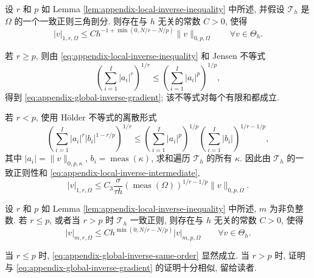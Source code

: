 \setcounter{statement}{2}
\begin{Corollary}\label{cor:appendix-global-inverse-gradient}
设 $r$ 和 $p$ 如 Lemma \ref{lem:appendix-local-inverse-inequality}
中所述, 并假设 $\mathcal{T}_h$ 是 $\Omega$ 的一个一致正则三角剖分.
则存在与 $h$ 无关的常数 $C>0$, 使得
\begin{equation}\label{eq:appendix-global-inverse-gradient}
|v|_{1,r,\Omega}
\leq
Ch^{-1+\min(0,N/r-N/p)}
\|v\|_{0,p,\Omega}
\qquad
\forall v\in\Theta_h.
\end{equation}
\end{Corollary}
\begin{Proof}
若 $r\geq p$, 则由
\eqref{eq:appendix-local-inverse-inequality} 和 Jensen 不等式
\begin{equation}\label{eq:appendix-discrete-jensen}
\left(\sum_{i=1}^I|a_i|^r\right)^{1/r}
\leq
\left(\sum_{i=1}^I|a_i|^p\right)^{1/p},
\end{equation}
得到 \eqref{eq:appendix-global-inverse-gradient};
该不等式对每个有限和都成立.

若 $r<p$, 使用 H\"older 不等式的离散形式
\begin{equation}\label{eq:appendix-discrete-holder}
\left(\sum_{i=1}^I|a_i|^r|b_i|^{1-r/p}\right)^{1/r}
\leq
\left(\sum_{i=1}^I|a_i|^p\right)^{1/p}
\left(\sum_{i=1}^I|b_i|\right)^{1/r-1/p},
\end{equation}
其中 $|a_i|=\|v\|_{0,p,\kappa}$,
$b_i=\operatorname{meas}(\kappa)$, 求和遍历 $\mathcal{T}_h$ 的所有
$\kappa$. 因此由 $\mathcal{T}_h$ 的一致正则性和
\eqref{eq:appendix-local-inverse-intermediate},
\[
|v|_{1,r,\Omega}
\leq
C_3\frac{\sigma}{\tau h}
(\operatorname{meas}(\Omega))^{1/r-1/p}
\|v\|_{0,p,\Omega}.
\]
\end{Proof}

\setcounter{statement}{6}
\begin{Lemma}\label{lem:appendix-global-inverse-same-order}
设 $r$ 和 $p$ 如 Lemma \ref{lem:appendix-local-inverse-inequality}
中所述, $m$ 为非负整数. 若 $r\leq p$, 或者当 $r>p$ 时
$\mathcal{T}_h$ 一致正则, 则存在与 $h$ 无关的常数 $C>0$, 使得
\begin{equation}\label{eq:appendix-global-inverse-same-order}
|v|_{m,r,\Omega}
\leq
Ch^{\min(0,N/r-N/p)}|v|_{m,p,\Omega}
\qquad
\forall v\in\Theta_h.
\end{equation}
\end{Lemma}
\begin{Proof}
当 $r\leq p$ 时, \eqref{eq:appendix-global-inverse-same-order} 显然成立.
当 $r>p$ 时, 证明与
\eqref{eq:appendix-global-inverse-gradient} 的证明十分相似, 留给读者.
\end{Proof}

